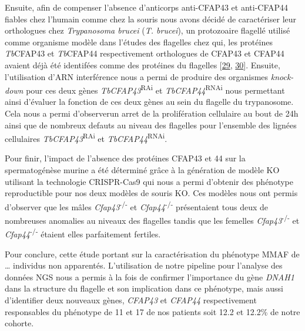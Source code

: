 \documentclass[12pt,twoside]{reedthesis}
\theoremstyle{definition}
\theoremstyle{definition}
\theoremstyle{remark}
\begin{document}
  Ensuite, afin de compenser l'absence d'anticorps anti-CFAP43 et
  anti-CFAP44 fiables chez l'humain comme chez la souris nous avons décidé
  de caractériser leur orthologues chez \emph{Trypanosoma brucei}
  (\emph{T. brucei}), un protozoaire flagellé utilisé comme organisme
  modèle dans l'études des flagelles chez qui, les protéines
  \emph{Tb}CFAP43 et \emph{Tb}CFAP44 respectivement orthologues de CFAP43
  et CFAP44 avaient déjà été identifées comme des protéines du flagelles
  {[}\protect\hyperlink{ref-Broadhead2006}{29},
  \protect\hyperlink{ref-Subota2014}{30}{]}. Ensuite, l'utilisation d'ARN
  interférence nous a permi de produire des organismes \emph{knock-down}
  pour ces deux gènes \emph{TbCFAP43}\textsuperscript{RAi} et
  \emph{TbCFAP44}\textsuperscript{RNAi} nous permettant ainsi d'évaluer la
  fonction de ces deux gènes au sein du flagelle du trypanosome. Cela nous
  a permi d'observerun arret de la prolifération cellulaire au bout de 24h
  ainsi que de nombreux defauts au niveau des flagelles pour l'ensemble
  des lignées cellulaires \emph{TbCFAP43}\textsuperscript{RAi} et
  \emph{TbCFAP44}\textsuperscript{RNAi}.
  
  Pour finir, l'impact de l'absence des protéines CFAP43 et 44 sur la
  spermatogénèse murine a été déterminé grâce à la génération de modèle KO
  utilisant la technologie CRISPR-Cas9 qui nous a permi d'obtenir des
  phénotype reproductible pour nos deux modèles de souris KO. Ces modèles
  nous ont permis d'observer que les mâles
  \emph{Cfap43}\textsuperscript{-/-} et \emph{Cfap44}\textsuperscript{-/-}
  présentaient tous deux de nombreuses anomalies au niveaux des flagelles
  tandis que les femelles \emph{Cfap43}\textsuperscript{-/-} et
  \emph{Cfap44}\textsuperscript{-/-} étaient elles parfaitement fertiles.
  
  Pour conclure, cette étude portant sur la caractérisation du phénotype
  MMAF de \ldots{} individus non apparentés. L'utilisation de notre
  pipeline pour l'analyse des données NGS nous a permis à la fois de
  confirmer l'importance du gène \emph{DNAH1} dans la structure du
  flagelle et son implication dans ce phénotype, mais aussi d'identifier
  deux nouveaux gènes, \emph{CFAP43} et \emph{CFAP44} respectivement
  responsables du phénotype de 11 et 17 de nos patients soit 12.2 et
  12.2\% de notre cohorte.
  
  \newpage
  
\end{document}
